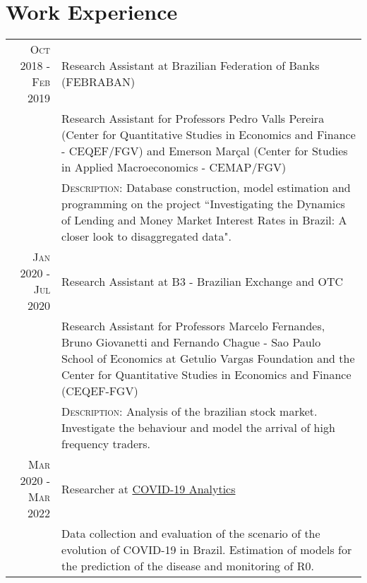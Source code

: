 \documentclass[a4paper,10pt]{article}
\begin{document}
\section{Work Experience}
\begin{tabular}{r|p{10.75cm}}
    \textsc{Oct 2018 - Feb 2019} & Research Assistant at Brazilian Federation of Banks (FEBRABAN) \\
    &\footnotesize{Research Assistant for Professors Pedro Valls Pereira (Center for Quantitative Studies in Economics and Finance - CEQEF/FGV) and Emerson Marçal (Center for Studies in Applied Macroeconomics - CEMAP/FGV)}\\
    &\footnotesize{\textsc{Description}: Database construction, model estimation and programming on the project ``Investigating the Dynamics of Lending and Money Market Interest Rates in Brazil: A closer look to disaggregated data".} \\
    \textsc{Jan 2020 - Jul 2020} & Research Assistant at B3 - Brazilian Exchange and OTC \\
    &\footnotesize{Research Assistant for Professors Marcelo Fernandes, Bruno Giovanetti and Fernando Chague - Sao Paulo School of Economics at Getulio Vargas Foundation and the Center for Quantitative Studies in Economics and Finance (CEQEF-FGV)} \\
    &\footnotesize{\textsc{Description}: Analysis of the brazilian stock market. Investigate the behaviour and model the arrival of high frequency traders.} \\
    \textsc{Mar 2020 - Mar 2022} & Researcher at \href{https://covid19analytics.com.br/}{COVID-19 Analytics} \\
    &\footnotesize{Data collection and evaluation of the scenario of the evolution of COVID-19 in Brazil. Estimation of models for the prediction of the disease and monitoring of R0.} 
\end{tabular}

\end{document}
